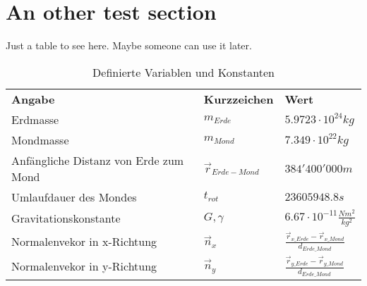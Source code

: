 \section{An other test section}
	Just a table to see here. Maybe someone can use it later.
	\begin{table}[ht]
		\begin{tabularx}{\textwidth}{l X X}
			\hline
			\textbf{Angabe}									& \textbf{Kurzzeichen}		& \textbf{Wert}\\
			Erdmasse										& $m_{Erde}$				& $5.9723 \cdot 10^{24} kg$\\
			Mondmasse										& $m_{Mond}$				& $7.349 \cdot 10^{22} kg$\\
			Anfängliche Distanz von Erde zum Mond			& $\vec{r}_{Erde-Mond}$		& $384'400'000 m$\\
			Umlaufdauer des Mondes							& $t_{rot}$					& $23605948.8 s$\\
			Gravitationskonstante							& $G, \gamma$				& $6.67 \cdot 10^{-11} \frac{Nm^2}{kg^2}$\\
			Normalenvekor in x-Richtung						& $\vec{n}_x$				& $\frac{\vec{r}_{x\_Erde} -\vec{r}_{x\_Mond}}{d_{Erde\_Mond}}$\\
			Normalenvekor in y-Richtung						& $\vec{n}_y$				& $\frac{\vec{r}_{y\_Erde} -\vec{r}_{y\_Mond}}{d_{Erde\_Mond}}$\\
			\hline
		\end{tabularx}
		\caption{Definierte Variablen und Konstanten}
	\end{table}